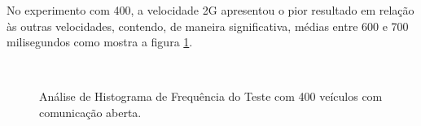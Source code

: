\documentclass[
	12pt,				%
	oneside,			%
	a4paper,			%
	english,			%
	brazil				%
	]{abntex2ppgsi}
\begin{document}
No experimento com 400,  a velocidade 2G apresentou o pior resultado em relação às outras velocidades, contendo, de maneira significativa, médias entre 600 e 700 milisegundos como mostra a figura \ref{fig:imgHistFreq400}.

\begin{figure}[h!]
	\caption{Análise de Histograma de Frequência do Teste  com 400 veículos com comunicação aberta.}
	\centering
	\label{fig:imgHistFreq400}
	\\
\end{figure}
\end{document}
